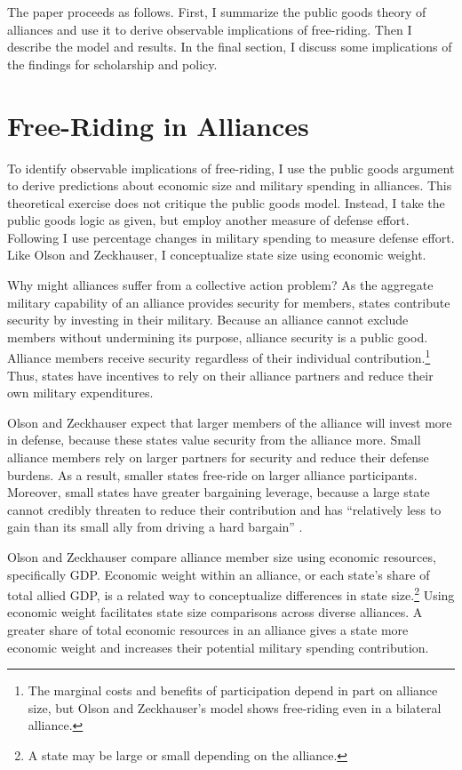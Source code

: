 \documentclass[12pt]{article}
\begin{document}
The paper proceeds as follows.
First, I summarize the public goods theory of alliances and use it to derive observable implications of free-riding.
Then I describe the model and results. 
In the final section, I discuss some implications of the findings for scholarship and policy. 



\section{Free-Riding in Alliances}

To identify observable implications of free-riding, I use the public goods argument to derive predictions about economic size and military spending in alliances.
This theoretical exercise does not critique the public goods model.
Instead, I take the public goods logic as given, but employ another measure of defense effort. 
Following \citet{PluemperNeumayer2015} I use percentage changes in military spending to measure defense effort.
Like Olson and Zeckhauser, I conceptualize state size using economic weight. 


Why might alliances suffer from a collective action problem?
As the aggregate military capability of an alliance provides security for members, states contribute security by investing in their military.
Because an alliance cannot exclude members without undermining its purpose, alliance security is a public good. 
Alliance members receive security regardless of their individual contribution.\footnote{The marginal costs and benefits of participation depend in part on alliance size, but Olson and Zeckhauser's model shows free-riding even in a bilateral alliance.}
Thus, states have incentives to rely on their alliance partners and reduce their own military expenditures.  

 
Olson and Zeckhauser expect that larger members of the alliance will invest more in defense, because these states value security from the alliance more.
Small alliance members rely on larger partners for security and reduce their defense burdens.
As a result, smaller states free-ride on larger alliance participants. 
Moreover, small states have greater bargaining leverage, because a large state cannot credibly threaten to reduce their contribution and has ``relatively less to gain than its small ally from driving a hard bargain'' \citep[pg. 274]{OlsonZeckhauser1966}. 


Olson and Zeckhauser compare alliance member size using economic resources, specifically GDP.
Economic weight within an alliance, or each state's share of total allied GDP, is a related way to conceptualize differences in state size.\footnote{A state may be large or small depending on the alliance.} 
Using economic weight facilitates state size comparisons across diverse alliances. 
A greater share of total economic resources in an alliance gives a state more economic weight and increases their potential military spending contribution. 
\end{document}
